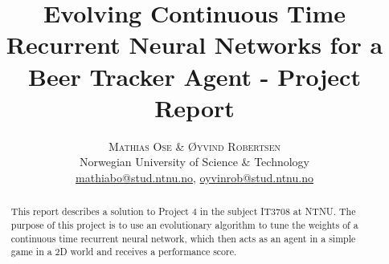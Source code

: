 \documentclass[twoside]{article}
\title{\vspace{-15mm}\fontsize{18pt}{10pt}\selectfont\textbf{Evolving Continuous Time Recurrent Neural Networks for a Beer Tracker Agent - Project Report}} %
\author{
    \large
    \textsc{Mathias Ose \& Øyvind Robertsen} \\ %
    \normalsize Norwegian University of Science \& Technology \\ %
    \normalsize \href{mailto:mathiabo@stud.ntnu.no}{mathiabo@stud.ntnu.no}, \href{mailto:oyvinrob@stud.ntnu.no}{oyvinrob@stud.ntnu.no} %
    \vspace{-5mm}
}
\date{}
\begin{document}
\maketitle %

\thispagestyle{fancy} %


\begin{abstract}

\noindent This report describes a solution to Project 4 in the subject IT3708 at NTNU. 
The purpose of this project is to use an evolutionary algorithm to tune the weights of a continuous time recurrent neural network, which then acts as an agent in a simple game in a 2D world and receives a performance score.
\end{abstract}

\end{document}
